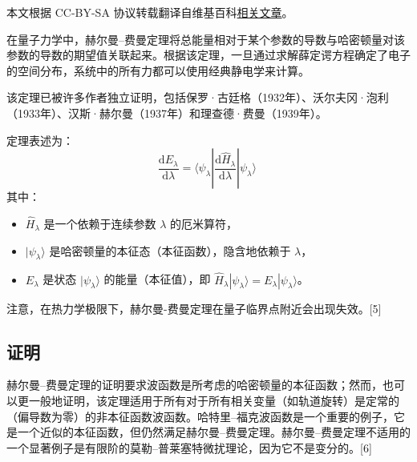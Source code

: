 
本文根据 CC-BY-SA 协议转载翻译自维基百科\href{https://en.wikipedia.org/wiki/Hellmann\%E2\%80\%93Feynman_theorem}{相关文章}。

在量子力学中，赫尔曼–费曼定理将总能量相对于某个参数的导数与哈密顿量对该参数的导数的期望值关联起来。根据该定理，一旦通过求解薛定谔方程确定了电子的空间分布，系统中的所有力都可以使用经典静电学来计算。

该定理已被许多作者独立证明，包括保罗·古廷格（1932年）、沃尔夫冈·泡利（1933年）、汉斯·赫尔曼（1937年）和理查德·费曼（1939年）。

定理表述为：
\[
\frac{\mathrm{d} E_{\lambda}}{\mathrm{d} \lambda} = \langle \psi_{\lambda} | \frac{\mathrm{d} \hat{H}_{\lambda}}{\mathrm{d} \lambda} | \psi_{\lambda} \rangle~
\]
其中：
\begin{itemize}
\item \(\hat{H}_{\lambda}\) 是一个依赖于连续参数 \(\lambda\) 的厄米算符，
\item \(|\psi_{\lambda} \rangle\) 是哈密顿量的本征态（本征函数），隐含地依赖于 \(\lambda\)，
\item \(E_{\lambda}\) 是状态 \(|\psi_{\lambda} \rangle\) 的能量（本征值），即 \(\hat{H}_{\lambda} |\psi_{\lambda} \rangle = E_{\lambda} |\psi_{\lambda} \rangle\)。
\end{itemize}
注意，在热力学极限下，赫尔曼-费曼定理在量子临界点附近会出现失效。[5]
\subsection{证明}
赫尔曼–费曼定理的证明要求波函数是所考虑的哈密顿量的本征函数；然而，也可以更一般地证明，该定理适用于所有对于所有相关变量（如轨道旋转）是定常的（偏导数为零）的非本征函数波函数。哈特里–福克波函数是一个重要的例子，它是一个近似的本征函数，但仍然满足赫尔曼–费曼定理。赫尔曼–费曼定理不适用的一个显著例子是有限阶的莫勒–普莱塞特微扰理论，因为它不是变分的。[6]

